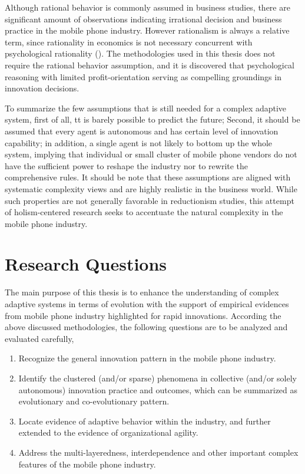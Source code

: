 \documentclass[utf8,english]{gradu3}
\begin{document}
Although rational behavior is commonly assumed in business studies, there are significant amount of observations indicating irrational decision and business practice in the mobile phone industry. However rationalism is always a relative term, since rationality in economics is not necessary concurrent with psychological rationality (\cite{hogarth1987rational}). The methodologies used in this thesis does not require the rational behavior assumption, and it is discovered that psychological reasoning with limited profit-orientation serving as compelling groundings in innovation decisions.

To summarize the few assumptions that is still needed for a complex adaptive system, first of all, tt is barely possible to predict the future; Second, it should be assumed that every agent is autonomous and has certain level of innovation capability; in addition, a single agent is not likely to bottom up the whole system, implying that individual or small cluster of mobile phone vendors do not have the sufficient power to reshape the industry nor to rewrite the comprehensive rules. It should be note that these assumptions are aligned with systematic complexity views and are highly realistic in the business world. While such properties are not generally favorable in reductionism studies, this attempt of holism-centered research seeks to accentuate the natural complexity in the mobile phone industry.

\section{Research Questions}

The main purpose of this thesis is to enhance the understanding of complex adaptive systems in terms of evolution with the support of empirical evidences from mobile phone industry highlighted for rapid innovations. According the above discussed methodologies, the following questions are to be analyzed and evaluated carefully,

\begin{enumerate}
    \item Recognize the general innovation pattern in the mobile phone industry.
    \item Identify the clustered (and/or sparse) phenomena in collective (and/or solely autonomous) innovation practice and outcomes, which can be summarized as evolutionary and co-evolutionary pattern.
    \item Locate evidence of adaptive behavior within the industry, and further extended to the evidence of organizational agility.
    \item Address the multi-layeredness, interdependence and other important complex features of the mobile phone industry.
\end{enumerate}
\end{document}
